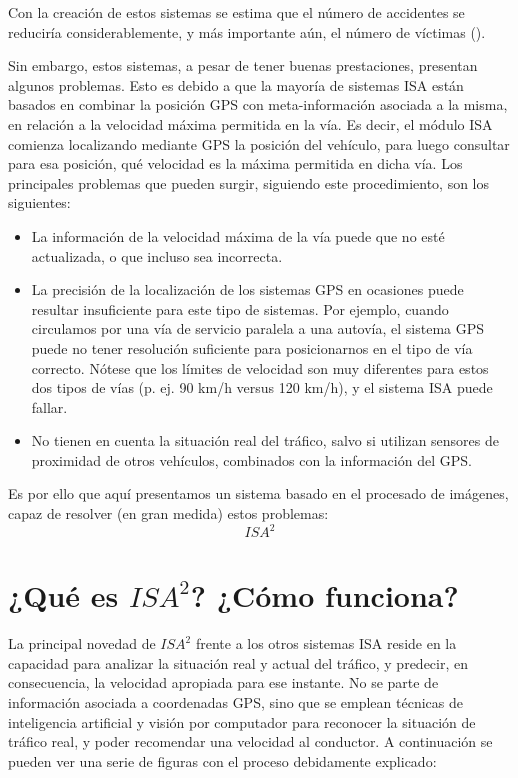 Con la creación de estos sistemas se estima que el número de accidentes se reduciría considerablemente, y más importante aún, el número de víctimas (\cite{reduccion}).


Sin embargo, estos sistemas, a pesar de tener buenas prestaciones, presentan algunos problemas. Esto es debido a que la mayoría de sistemas \ac{ISA} están basados en combinar la posición \ac{GPS} con meta-información asociada a la misma, en relación a la velocidad máxima permitida en la vía. Es decir, el módulo \ac{ISA} comienza localizando mediante \ac{GPS} la posición del vehículo, para luego consultar para esa posición, qué velocidad es la máxima permitida en dicha vía. Los principales problemas que pueden surgir, siguiendo este procedimiento, son los siguientes:

\begin{itemize}
\item La información de la velocidad máxima de la vía puede que no esté actualizada, o que incluso sea incorrecta.
\item La precisión de la localización de los sistemas GPS en ocasiones puede resultar insuficiente para este tipo de sistemas. Por ejemplo, cuando circulamos por una vía de servicio paralela a una autovía, el sistema GPS puede no tener resolución suficiente para posicionarnos en el tipo de vía correcto. Nótese que los límites de velocidad son muy diferentes para estos dos tipos de vías (p. ej. 90 km/h versus 120 km/h), y el sistema ISA puede fallar.
\item No tienen en cuenta la situación real del tráfico, salvo si utilizan sensores de proximidad de otros vehículos, combinados con la información del GPS.
\end{itemize}


Es por ello que aquí presentamos un sistema basado en el procesado de imágenes, capaz de resolver (en gran medida) estos problemas: \[ISA^{2}\]


\section{¿Qué es $ISA^{2}$? ¿Cómo funciona?}


La principal novedad de $ISA^{2}$ frente a los otros sistemas \ac{ISA} reside en la capacidad para analizar la situación real y actual del tráfico, y predecir, en consecuencia, la velocidad apropiada para ese instante. No se parte de información asociada a coordenadas GPS, sino que se emplean técnicas de inteligencia artificial y visión por computador para reconocer la situación de tráfico real, y poder recomendar una velocidad al conductor. A continuación se pueden ver una serie de figuras con el proceso debidamente explicado:


